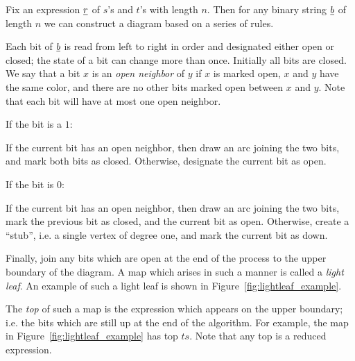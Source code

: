 Fix an expression $\underline{r}$ of $s$'s and $t$'s with length $n$.  Then for any binary string $\underline{b}$ of length $n$ we can construct a diagram based on a series of rules.

Each bit of $\underline{b}$ is read from left to right in order and designated either open or closed; the state of a bit can change more than once.  Initially all bits are closed.  We say that a bit $x$ is an \emph{open neighbor} of $y$ if $x$ is marked open, $x$ and $y$ have the same color, and there are no other bits marked open between $x$ and $y$.  Note that each bit will have at most one open neighbor.

\begin{itemize}
	\ii If the bit is a $1$:
	\begin{itemize}
		\ii If the current bit has an open neighbor, then draw an arc joining the two bits, and mark both bits as closed.
		\ii Otherwise, designate the current bit as open.
	\end{itemize}
	\ii If the bit is $0$:
	\begin{itemize}
		\ii If the current bit has an open neighbor, then draw an arc joining the two bits, mark the previous bit as closed, and the current bit as open.
		\ii Otherwise, create a ``stub'', i.e. a single vertex of degree one, and mark the current bit as down.
	\end{itemize}
\end{itemize}
Finally, join any bits which are open at the end of the process to the upper boundary of the diagram.  A map which arises in such a manner is called a \emph{light leaf}.  An example of such a light leaf is shown in Figure~\ref{fig:lightleaf_example}.

The \emph{top} of such a map is the expression which appears on the upper boundary; i.e. the bits which are still up at the end of the algorithm.  For example, the map in Figure~\ref{fig:lightleaf_example} has top $ts$.  Note that any top is a reduced expression.  


